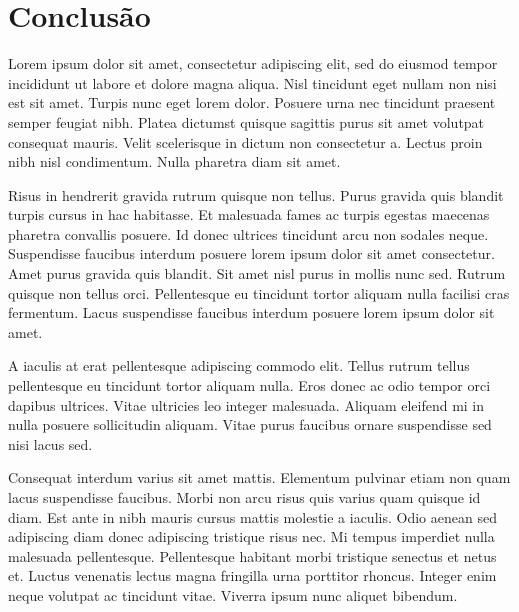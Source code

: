 
\chapter{Conclusão}


Lorem ipsum dolor sit amet, consectetur adipiscing elit, sed do eiusmod tempor incididunt
ut labore et dolore magna aliqua. Nisl tincidunt eget nullam non nisi est sit amet. Turpis
nunc eget lorem dolor. Posuere urna nec tincidunt praesent semper feugiat nibh. Platea
dictumst quisque sagittis purus sit amet volutpat consequat mauris. Velit scelerisque in
dictum non consectetur a. Lectus proin nibh nisl condimentum. Nulla pharetra diam sit amet.

Risus in hendrerit gravida rutrum quisque non tellus. Purus gravida quis blandit turpis cursus
in hac habitasse. Et malesuada fames ac turpis egestas maecenas pharetra convallis posuere.
Id donec ultrices tincidunt arcu non sodales neque. Suspendisse faucibus interdum posuere lorem
ipsum dolor sit amet consectetur. Amet purus gravida quis blandit. Sit amet nisl purus in mollis
nunc sed. Rutrum quisque non tellus orci. Pellentesque eu tincidunt tortor aliquam nulla
facilisi cras fermentum. Lacus suspendisse faucibus interdum posuere lorem ipsum dolor sit amet.

A iaculis at erat pellentesque adipiscing commodo elit. Tellus rutrum tellus pellentesque eu
tincidunt tortor aliquam nulla. Eros donec ac odio tempor orci dapibus ultrices. Vitae ultricies
leo integer malesuada. Aliquam eleifend mi in nulla posuere sollicitudin aliquam. Vitae purus
faucibus ornare suspendisse sed nisi lacus sed.

Consequat interdum varius sit amet mattis. Elementum pulvinar etiam non quam lacus suspendisse
faucibus. Morbi non arcu risus quis varius quam quisque id diam. Est ante in nibh mauris cursus
mattis molestie a iaculis. Odio aenean sed adipiscing diam donec adipiscing tristique risus nec.
Mi tempus imperdiet nulla malesuada pellentesque. Pellentesque habitant morbi tristique senectus
et netus et. Luctus venenatis lectus magna fringilla urna porttitor rhoncus. Integer enim neque
volutpat ac tincidunt vitae. Viverra ipsum nunc aliquet bibendum.